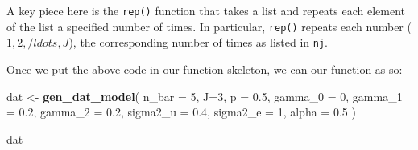 \documentclass[
]{book}
\newenvironment{Shaded}{\begin{snugshade}}{\end{snugshade}}
\newcommand{\AttributeTok}[1]{\textcolor[rgb]{0.13,0.29,0.53}{#1}}
\newcommand{\CommentTok}[1]{\textcolor[rgb]{0.56,0.35,0.01}{\textit{#1}}}
\newcommand{\DecValTok}[1]{\textcolor[rgb]{0.00,0.00,0.81}{#1}}
\newcommand{\FloatTok}[1]{\textcolor[rgb]{0.00,0.00,0.81}{#1}}
\newcommand{\FunctionTok}[1]{\textcolor[rgb]{0.13,0.29,0.53}{\textbf{#1}}}
\newcommand{\NormalTok}[1]{#1}
\newcommand{\OtherTok}[1]{\textcolor[rgb]{0.56,0.35,0.01}{#1}}
\newcommand{\SpecialCharTok}[1]{\textcolor[rgb]{0.81,0.36,0.00}{\textbf{#1}}}
\begin{document}
\begin{Shaded}
\end{Shaded}

A key piece here is the \texttt{rep()} function that takes a list and repeats each element of the list a specified number of times.
In particular, \texttt{rep()} repeats each number (\(1, 2, /ldots,J\)), the corresponding number of times as listed in \texttt{nj}.

Once we put the above code in our function skeleton, we can our function as so:

\begin{Shaded}
\begin{Highlighting}[]
\NormalTok{dat }\OtherTok{\textless{}{-}} \FunctionTok{gen\_dat\_model}\NormalTok{( }\AttributeTok{n\_bar =} \DecValTok{5}\NormalTok{, }\AttributeTok{J=}\DecValTok{3}\NormalTok{, }\AttributeTok{p =} \FloatTok{0.5}\NormalTok{, }
                      \AttributeTok{gamma\_0 =} \DecValTok{0}\NormalTok{, }\AttributeTok{gamma\_1 =} \FloatTok{0.2}\NormalTok{, }\AttributeTok{gamma\_2 =} \FloatTok{0.2}\NormalTok{,}
                      \AttributeTok{sigma2\_u =} \FloatTok{0.4}\NormalTok{, }\AttributeTok{sigma2\_e =} \DecValTok{1}\NormalTok{,}
                      \AttributeTok{alpha =} \FloatTok{0.5}\NormalTok{ )}

\NormalTok{dat}
\end{Highlighting}
\end{Shaded}
\end{document}
